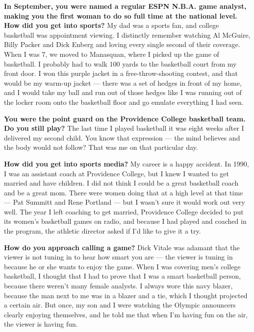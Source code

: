 \textbf{In September, you were named a regular ESPN N.B.A. game analyst,
making you the first woman to do so full time at the national level. How
did you get into sports?} My dad was a sports fan, and college
basketball was appointment viewing. I distinctly remember watching Al
McGuire, Billy Packer and Dick Enberg and loving every single second of
their coverage. When I was 7, we moved to Manasquan, where I picked up
the game of basketball. I probably had to walk 100 yards to the
basketball court from my front door. I won this purple jacket in a
free-throw-shooting contest, and that would be my warm-up jacket ---
there was a set of hedges in front of my home, and I would take my ball
and run out of those hedges like I was running out of the locker room
onto the basketball floor and go emulate everything I had seen.

\textbf{You were the point guard on the Providence College basketball
team. Do you still play?} The last time I played basketball it was eight
weeks after I delivered my second child. You know that expression ---
the mind believes and the body would not follow? That was me on that
particular day.

\textbf{How did you get into sports media?} My career is a happy
accident. In 1990, I was an assistant coach at Providence College, but I
knew I wanted to get married and have children. I did not think I could
be a great basketball coach and be a great mom. There were women doing
that at a high level at that time --- Pat Summitt and Rene Portland ---
but I wasn't sure it would work out very well. The year I left coaching
to get married, Providence College decided to put its women's basketball
games on radio, and because I had played and coached in the program, the
athletic director asked if I'd like to give it a try.

\textbf{How do you approach calling a game?} Dick Vitale was adamant
that the viewer is not tuning in to hear how smart you are --- the
viewer is tuning in because he or she wants to enjoy the game. When I
was covering men's college basketball, I thought that I had to prove
that I was a smart basketball person, because there weren't many female
analysts. I always wore this navy blazer, because the man next to me was
in a blazer and a tie, which I thought projected a certain air. But
once, my son and I were watching the Olympic announcers clearly enjoying
themselves, and he told me that when I'm having fun on the air, the
viewer is having fun.

